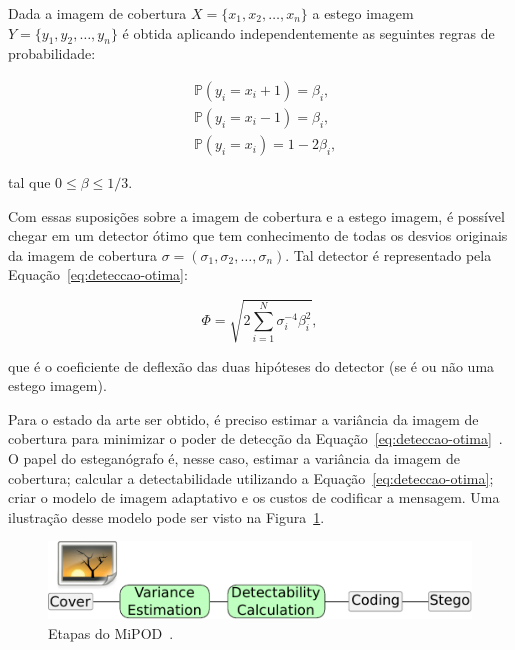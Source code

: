 Dada a imagem de cobertura $X = \{x_1, x_2, \dots, x_n\}$ a estego imagem $Y = \{y_1, y_2, \dots, y_n\}$ é obtida aplicando independentemente as seguintes regras de probabilidade:

\begin{align*}
	&\mathbb{P}(y_i = x_i + 1) = \beta_i, \\
	&\mathbb{P}(y_i = x_i - 1) = \beta_i, \\
	&\mathbb{P}(y_i = x_i)     = 1-2\beta_i,
\end{align*}

\noindent tal que $0 \le \beta \le 1/3$.

Com essas suposições sobre a imagem de cobertura e a estego imagem, é possível chegar em um detector ótimo que tem conhecimento de todas os desvios originais da imagem de cobertura $\sigma = (\sigma_1, \sigma_2, \dots, \sigma_n)$. Tal detector é representado pela Equação~\ref{eq:deteccao-otima}:

\begin{equation}
	\label{eq:deteccao-otima}
	\Phi = \sqrt{2\sum^N_{i=1}\sigma_i^{-4}\beta_i^2},
\end{equation}

\noindent que é o coeficiente de deflexão das duas hipóteses do detector (se é ou não uma estego imagem).

Para o estado da arte ser obtido, é preciso estimar a variância da imagem de cobertura para minimizar o poder de detecção da Equação~\ref{eq:deteccao-otima}~\cite{sedighi2016content}. O papel do esteganógrafo é, nesse caso, estimar a variância da imagem de cobertura; calcular a detectabilidade utilizando a Equação~\ref{eq:deteccao-otima}; criar o modelo de imagem adaptativo e os custos de codificar a mensagem. Uma ilustração desse modelo pode ser visto na Figura~\ref{fig:mipod}.

\begin{figure}[h]
	\center
	\includegraphics{dados/figuras/mipod.pdf}
	\caption{Etapas do MiPOD~\cite{sedighi2016content}.}
	\label{fig:mipod}
\end{figure}


